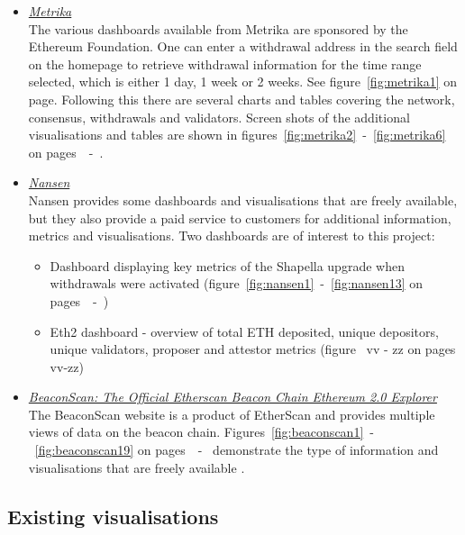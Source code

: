 \documentclass[UTF8]{article}
\begin{document}
{\begin{itemize}
	\item \textit{\href{https://app.metrika.co/ethereum/}{Metrika}} \\
	The various dashboards available from Metrika are sponsored by the Ethereum Foundation. One can enter a withdrawal address in the search field on the homepage to retrieve withdrawal information for the time range selected, which is either 1 day, 1 week or 2 weeks. See figure~\ref{fig:metrika1} on page\pageref{fig:metrika1}. Following this there are several charts and tables covering the network, consensus, withdrawals and validators. Screen shots of the additional visualisations and tables are shown in figures~\ref{fig:metrika2}~-~\ref{fig:metrika6} on pages~\pageref{fig:metrika2}~-~\pageref{fig:metrika6}.
	
	\item \textit{\href{https://pro.nansen.ai/}{Nansen}}\\
	Nansen provides some dashboards and visualisations that are freely available, but they also provide a paid service to customers for additional information, metrics and visualisations.
	Two dashboards are of interest to this project:
	\begin{itemize}
		\item Dashboard displaying key metrics of the Shapella upgrade when withdrawals were activated (figure~\ref{fig:nansen1}~-~\ref{fig:nansen13} on pages~\pageref{fig:nansen1}~-~\pageref{fig:nansen13}) \cite{nansenshapella}
		\item Eth2 dashboard  - overview of total ETH deposited, unique depositors, unique validators, proposer and attestor metrics (figure~ vv - zz on pages vv-zz) \cite{nanseneth2}
	\end{itemize}
	\item \textit{\href{https://beaconscan.com}{BeaconScan: The Official Etherscan Beacon Chain Ethereum 2.0 Explorer}}\\
	The BeaconScan website is a product of EtherScan and provides multiple views of data on the beacon chain. Figures~\ref{fig:beaconscan1}~-~\ref{fig:beaconscan19} on pages~\pageref{fig:beaconscan1}~-~\pageref{fig:beaconscan19} demonstrate the type of information and visualisations that are freely available \cite{etherscan}.
\end{itemize}

\clearpage

\subsection{Existing visualisations}
}
\end{document}
